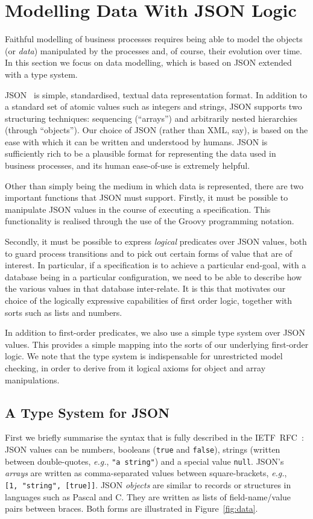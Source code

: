 \documentclass{llncs}
\newcommand{\eg}{\textit{e.g.}}
\begin{document}
\section{Modelling Data With JSON Logic}
\label{sec:data}
Faithful modelling of business processes requires being able to model the objects (or \emph{data}) manipulated by the processes and, of course, their evolution over time.
In this section we focus on data modelling, which is based on JSON extended with a type system.

JSON~\cite{JSON} is simple, standardised, textual data representation format.  In
addition to a standard set of atomic values such as integers and strings, JSON
supports two structuring techniques: sequencing (``arrays'') and arbitrarily nested
hierarchies (through ``objects'').
Our choice of JSON (rather than XML, say), is based on the ease with which it can be
written and understood by humans.  JSON is sufficiently rich to be a plausible format
for representing the data used in business processes, and its human ease-of-use is
extremely helpful. 

Other than simply being the medium in which data is represented, there are two
important functions that JSON must support.  Firstly, it must be possible to
manipulate JSON values in the course of executing a specification. This
functionality is realised through the use of the Groovy programming notation.

Secondly, it must be possible to express \emph{logical} predicates over JSON values,
both to guard process transitions and to pick out certain forms of value that are of
interest.  In particular, if a specification is to achieve a particular end-goal,
with a database being in a particular configuration, we need to be able to describe
how the various values in that database inter-relate.  It is this that motivates our
choice of the logically expressive capabilities of first order logic, together with
sorts such as lists and numbers.

In addition to first-order predicates, we also use a simple type system over JSON
values.  This provides a simple mapping into the sorts of our underlying first-order logic.
We note that the type system is indispensable for unrestricted model checking, in
order to derive from it logical axioms for object and array manipulations.

\subsection{A Type System for JSON}
First we briefly summarise the syntax that is fully described in the IETF~RFC~\cite{JSON}:
JSON values can be numbers, booleans (\texttt{true} and \texttt{false}), strings (written between double-quotes, \eg, \texttt{"a~string"}) and a special value \texttt{null}.
JSON's \emph{arrays} are written as comma-separated values between square-brackets, \eg, \texttt{[1,~"string",~[true]]}.
JSON \emph{objects} are similar to records or structures in languages such as Pascal and C.
They are written as lists of field-name/value pairs between braces.
Both forms are illustrated in Figure~\ref{fig:data}.
\end{document}
